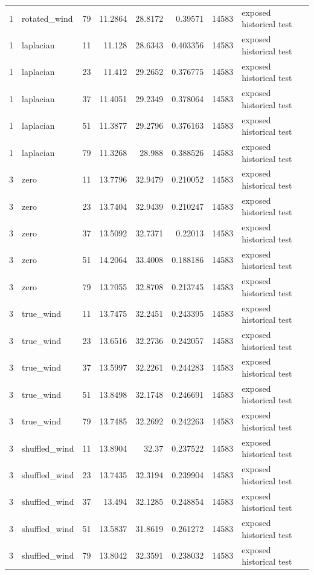 \begin{tabular}{rllrrrrl}
1 & rotated\_wind & 79 & 11.2864 & 28.8172 & 0.39571 & 14583 & exposed historical test \\
1 & laplacian & 11 & 11.128 & 28.6343 & 0.403356 & 14583 & exposed historical test \\
1 & laplacian & 23 & 11.412 & 29.2652 & 0.376775 & 14583 & exposed historical test \\
1 & laplacian & 37 & 11.4051 & 29.2349 & 0.378064 & 14583 & exposed historical test \\
1 & laplacian & 51 & 11.3877 & 29.2796 & 0.376163 & 14583 & exposed historical test \\
1 & laplacian & 79 & 11.3268 & 28.988 & 0.388526 & 14583 & exposed historical test \\
3 & zero & 11 & 13.7796 & 32.9479 & 0.210052 & 14583 & exposed historical test \\
3 & zero & 23 & 13.7404 & 32.9439 & 0.210247 & 14583 & exposed historical test \\
3 & zero & 37 & 13.5092 & 32.7371 & 0.22013 & 14583 & exposed historical test \\
3 & zero & 51 & 14.2064 & 33.4008 & 0.188186 & 14583 & exposed historical test \\
3 & zero & 79 & 13.7055 & 32.8708 & 0.213745 & 14583 & exposed historical test \\
3 & true\_wind & 11 & 13.7475 & 32.2451 & 0.243395 & 14583 & exposed historical test \\
3 & true\_wind & 23 & 13.6516 & 32.2736 & 0.242057 & 14583 & exposed historical test \\
3 & true\_wind & 37 & 13.5997 & 32.2261 & 0.244283 & 14583 & exposed historical test \\
3 & true\_wind & 51 & 13.8498 & 32.1748 & 0.246691 & 14583 & exposed historical test \\
3 & true\_wind & 79 & 13.7485 & 32.2692 & 0.242263 & 14583 & exposed historical test \\
3 & shuffled\_wind & 11 & 13.8904 & 32.37 & 0.237522 & 14583 & exposed historical test \\
3 & shuffled\_wind & 23 & 13.7435 & 32.3194 & 0.239904 & 14583 & exposed historical test \\
3 & shuffled\_wind & 37 & 13.494 & 32.1285 & 0.248854 & 14583 & exposed historical test \\
3 & shuffled\_wind & 51 & 13.5837 & 31.8619 & 0.261272 & 14583 & exposed historical test \\
3 & shuffled\_wind & 79 & 13.8042 & 32.3591 & 0.238032 & 14583 & exposed historical test \\

\end{tabular}

